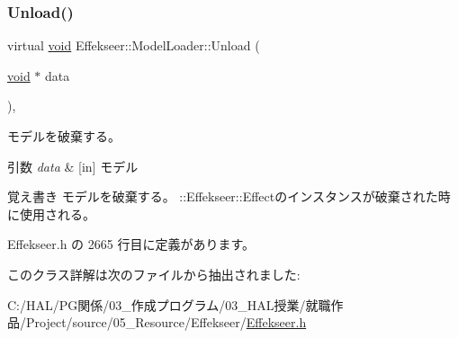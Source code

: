 \subsubsection{\texorpdfstring{Unload()}{Unload()}}
{\footnotesize\ttfamily virtual \mbox{\hyperlink{namespace_effekseer_ab34c4088e512200cf4c2716f168deb56}{void}} Effekseer\+::\+Model\+Loader\+::\+Unload (\begin{DoxyParamCaption}\item[{\mbox{\hyperlink{namespace_effekseer_ab34c4088e512200cf4c2716f168deb56}{void}} $\ast$}]{data }\end{DoxyParamCaption})\hspace{0.3cm}{\ttfamily [inline]}, {\ttfamily [virtual]}}



モデルを破棄する。 


\begin{DoxyParams}{引数}
{\em data} & \mbox{[}in\mbox{]} モデル \\
\hline
\end{DoxyParams}
\begin{DoxyNote}{覚え書き}
モデルを破棄する。 \+::\+Effekseer\+::\+Effectのインスタンスが破棄された時に使用される。 
\end{DoxyNote}


 Effekseer.\+h の 2665 行目に定義があります。



このクラス詳解は次のファイルから抽出されました\+:\begin{DoxyCompactItemize}
\item 
C\+:/\+H\+A\+L/\+P\+G関係/03\+\_\+作成プログラム/03\+\_\+\+H\+A\+L授業/就職作品/\+Project/source/05\+\_\+\+Resource/\+Effekseer/\mbox{\hyperlink{_effekseer_8h}{Effekseer.\+h}}\end{DoxyCompactItemize}

